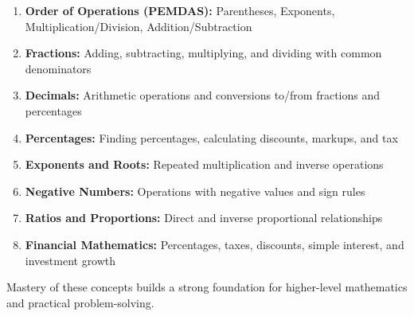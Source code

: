 \documentclass[12pt]{article}
\begin{document}
\begin{enumerate}
\item \textbf{Order of Operations (PEMDAS):} Parentheses, Exponents, Multiplication/Division, Addition/Subtraction
\item \textbf{Fractions:} Adding, subtracting, multiplying, and dividing with common denominators
\item \textbf{Decimals:} Arithmetic operations and conversions to/from fractions and percentages
\item \textbf{Percentages:} Finding percentages, calculating discounts, markups, and tax
\item \textbf{Exponents and Roots:} Repeated multiplication and inverse operations
\item \textbf{Negative Numbers:} Operations with negative values and sign rules
\item \textbf{Ratios and Proportions:} Direct and inverse proportional relationships
\item \textbf{Financial Mathematics:} Percentages, taxes, discounts, simple interest, and investment growth
\end{enumerate}

Mastery of these concepts builds a strong foundation for higher-level mathematics and practical problem-solving.
\end{document}
